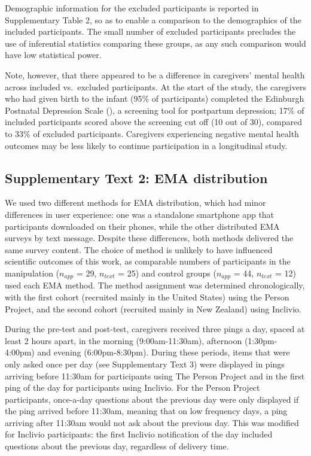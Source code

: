 \documentclass[
]{article}
\begin{document}
Demographic information for the excluded participants is reported in
Supplementary Table 2, so as to enable a comparison to the demographics
of the included participants. The small number of excluded participants
precludes the use of inferential statistics comparing these groups, as
any such comparison would have low statistical power.

Note, however, that there appeared to be a difference in caregivers'
mental health across included vs.~excluded participants. At the start of
the study, the caregivers who had given birth to the infant (95\% of
participants) completed the Edinburgh Postnatal Depression Scale
(), a screening tool for
postpartum depression; 17\% of included participants scored above the
screening cut off (10 out of 30), compared to 33\% of excluded
participants. Caregivers experiencing negative mental health outcomes
may be less likely to continue participation in a longitudinal study.

\subsection*{Supplementary Text 2: EMA
distribution}\label{supplementary-text-2-ema-distribution}

We used two different methods for EMA distribution, which had minor
differences in user experience: one was a standalone smartphone app that
participants downloaded on their phones, while the other distributed EMA
surveys by text message. Despite these differences, both methods
delivered the same survey content. The choice of method is unlikely to
have influenced scientific outcomes of this work, as comparable numbers
of participants in the manipulation (\(n_{app}\) = 29, \(n_{text}\) =
25) and control groups (\(n_{app}\) = 44, \(n_{text}\) = 12) used each
EMA method. The method assignment was determined chronologically, with
the first cohort (recruited mainly in the United States) using the
Person Project, and the second cohort (recruited mainly in New Zealand)
using Inclivio.

During the pre-test and post-test, caregivers received three pings a
day, spaced at least 2 hours apart, in the morning (9:00am-11:30am),
afternoon (1:30pm-4:00pm) and evening (6:00pm-8:30pm). During these
periods, items that were only asked once per day (see Supplementary Text
3) were displayed in pings arriving before 11:30am for participants
using The Person Project and in the first ping of the day for
participants using Inclivio. For the Person Project participants,
once-a-day questions about the previous day were only displayed if the
ping arrived before 11:30am, meaning that on low frequency days, a ping
arriving after 11:30am would not ask about the previous day. This was
modified for Inclivio participants: the first Inclivio notification of
the day included questions about the previous day, regardless of
delivery time.
\end{document}
